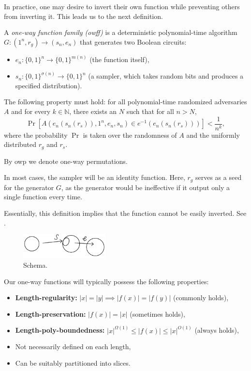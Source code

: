 In practice, one may desire to invert their own function while preventing others from inverting it.
This leads us to the next definition.

\begin{definition}
    A \emph{one-way function family (owff)} is a deterministic polynomial-time algorithm $G \colon (1^n, r_g) \to (s_n, e_n)$ that generates two Boolean circuits:
    \begin{itemize}
        \item $e_n \colon \{0, 1\}^n \to \{0, 1\}^{m(n)}$ (the function itself),
        \item $s_n \colon \{0, 1\}^{\sigma(n)} \to \{0, 1\}^n$ (a sampler, which takes random bits and produces a specified distribution).
    \end{itemize}
    The following property must hold: for all polynomial-time randomized adversaries $A$ and for every $k \in \mathbb{N}$, there exists an $N$ such that for all $n > N$,
    \[
        \Pr[A(e_n(s_n(r_s)), 1^n, e_n, s_n) \in e^{-1}(e_n(s_n(r_s)))] < \frac{1}{n^k},
    \]
    where the probability $\Pr$ is taken over the randomness of $A$ and the uniformly distributed $r_g$ and $r_s$.
\end{definition}
By owp we denote one-way permutations.

In most cases, the sampler will be an identity function.
Here, $r_g$ serves as a seed for the generator $G$, as the generator would be ineffective if it output only a single function every time.

Essentially, this definition implies that the function cannot be easily inverted.
See .

\begin{figure}[H]
    \centering
    \includegraphics[width=0.4\textwidth]{figures/2FC91310-FBF1-4D04-ABDB-24F1FDF8893A}
    \caption{Schema.}
    \label{fig:2fc91310-fbf1-4d04-abdb-24f1fdf8893a}
\end{figure}

Our one-way functions will typically possess the following properties:
\begin{itemize}
    \item \textbf{Length-regularity:} $|x| = |y| \implies |f(x)| = |f(y)|$ (commonly holds),
    \item \textbf{Length-preservation:} $|f(x)| = |x|$ (sometimes holds),
    \item \textbf{Length-poly-boundedness:} $|x|^{\Omega(1)} \leq |f(x)| \leq |x|^{O(1)}$ (always holds),
    \item Not necessarily defined on each length,
    \item Can be suitably partitioned into slices.
\end{itemize}

